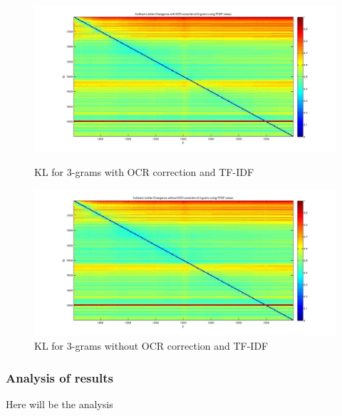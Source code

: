 \begin{figure}[h!]
    \begin{minipage}[b]{0.48\linewidth}
        \includegraphics[scale=0.15]{Pictures/kullback-leibler/KL_2-grams_with_correction_tfidf.jpg}
        \caption{KL for 3-grams with OCR correction and TF-IDF}
        \label{}
    \end{minipage}\hfill
    \begin{minipage}[b]{0.5\linewidth}
        \includegraphics[scale=0.15]{Pictures/kullback-leibler/KL_2-grams_without_correction_tfidf.jpg}
        \caption{KL for 3-grams without OCR correction and TF-IDF}
        \label{}
    \end{minipage}\hfill
\end{figure}

\newpage{}

\subsubsection{Analysis of results}
Here will be the analysis
